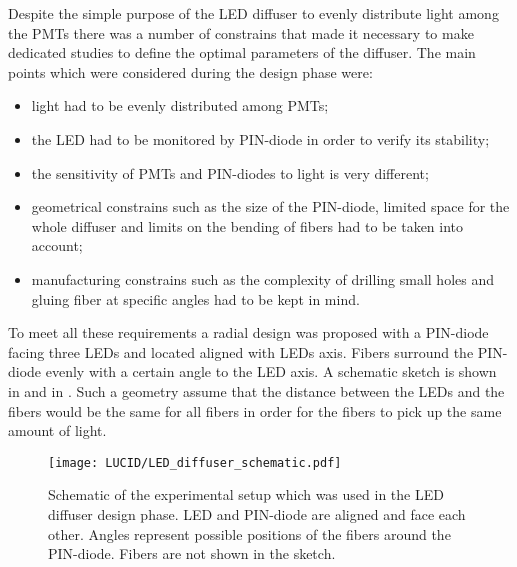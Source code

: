 
Despite the simple purpose of the LED diffuser to evenly distribute light among the PMTs 
there was a number of constrains that made it necessary to make dedicated studies 
to define the optimal parameters of the diffuser. The main points which were considered during the design phase were:
\begin{itemize}
 \item light had to be evenly distributed among PMTs;
 \item the LED had to be monitored by PIN-diode in order to verify its stability;
 \item the sensitivity of PMTs and PIN-diodes to light is very different;
 \item geometrical constrains such as the size of the PIN-diode, 
       limited space for the whole diffuser and limits on the bending of fibers had to be taken into account;
 \item manufacturing constrains such as the complexity of drilling small holes and gluing fiber at specific angles had to be kept in mind.
\end{itemize}

To meet all these requirements a radial design was proposed with a PIN-diode facing three LEDs and located aligned with LEDs axis. Fibers surround the PIN-diode 
evenly with a certain angle to the LED axis. A schematic sketch is shown in  and in .
Such a geometry assume that the distance between the LEDs and the fibers would be the same for all fibers in order for 
the fibers to pick up the same amount of light.
  
\begin{figure}
\centering
\texttt{[image: LUCID/LED\_diffuser\_schematic.pdf]}
\caption{Schematic of the experimental setup which was used in the LED diffuser design phase. LED and PIN-diode are aligned and face each other. 
	 Angles represent possible positions of the fibers around the PIN-diode. Fibers are not shown in the sketch.}
\label{fig:AngularMeasurementSetup}
\end{figure}

